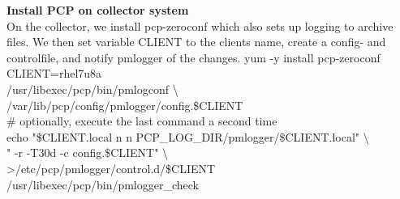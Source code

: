 \documentclass[12pt]{article}
\begin{document}
\begin{tcbposter}
{		\textbf{Install PCP on collector system} \\
On the collector, we install pcp-zeroconf which also sets up logging to archive files.
We then set variable CLIENT to the clients name, create a config- and controlfile,
and notify pmlogger of the changes.
    \hspace*{0.5cm} yum -y install pcp-zeroconf \\
    \hspace*{0.5cm} CLIENT=rhel7u8a \\
    \hspace*{0.5cm} /usr/libexec/pcp/bin/pmlogconf \textbackslash \\
    \hspace*{1.5cm} /var/lib/pcp/config/pmlogger/config.\$CLIENT \\
    \hspace*{0.5cm} \# optionally, execute the last command a second time \\
    \hspace*{0.5cm} echo "\$CLIENT.local n n PCP\_LOG\_DIR/pmlogger/\$CLIENT.local" \textbackslash \\
    \hspace*{1.5cm} " -r -T30d -c config.\$CLIENT" \textbackslash \\
    \hspace*{1.5cm} >/etc/pcp/pmlogger/control.d/\$CLIENT \\
    \hspace*{0.5cm} /usr/libexec/pcp/bin/pmlogger\_check



}

\end{tcbposter}
\end{document}
